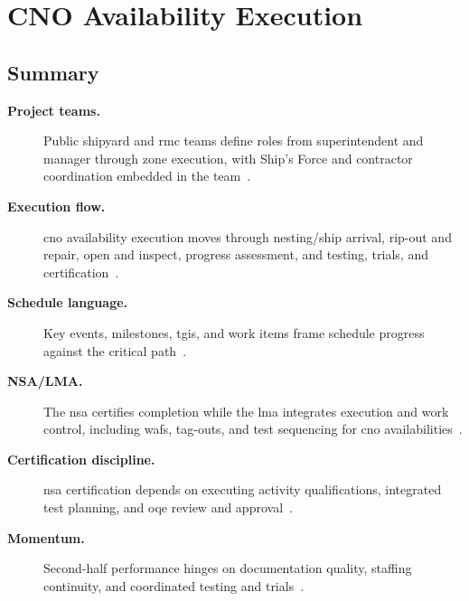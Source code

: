 \documentclass[../main.tex]{subfiles}
\begin{document}
\section{CNO Availability Execution}

\subsection{Summary}
\begin{description}
  \item[\textbf{Project teams.}] Public shipyard and \ac{rmc} teams define roles from superintendent and manager through zone execution, with Ship's Force and contractor coordination embedded in the team~\autocite{edo-4-2-2-cno-availability-execution-2025}.
  \item[\textbf{Execution flow.}] \ac{cno} availability execution moves through nesting/ship arrival, rip-out and repair, open and inspect, progress assessment, and testing, trials, and certification~\autocite{edo-4-2-2-cno-availability-execution-2025}.
  \item[\textbf{Schedule language.}] Key events, milestones, \acp{tgi}, and work items frame schedule progress against the critical path~\autocite{edo-4-2-2-cno-availability-execution-2025}.
  \item[\textbf{NSA/LMA.}] The \ac{nsa} certifies completion while the \ac{lma} integrates execution and work control, including \acp{waf}, tag-outs, and test sequencing for \ac{cno} availabilities~\autocite{edo-4-2-2-cno-availability-execution-2025}.
  \item[\textbf{Certification discipline.}] \ac{nsa} certification depends on executing activity qualifications, integrated test planning, and \ac{oqe} review and approval~\autocite{edo-4-2-2-cno-availability-execution-2025}.
  \item[\textbf{Momentum.}] Second-half performance hinges on documentation quality, staffing continuity, and coordinated testing and trials~\autocite{edo-4-2-2-cno-availability-execution-2025}.
\end{description}
\end{document}
